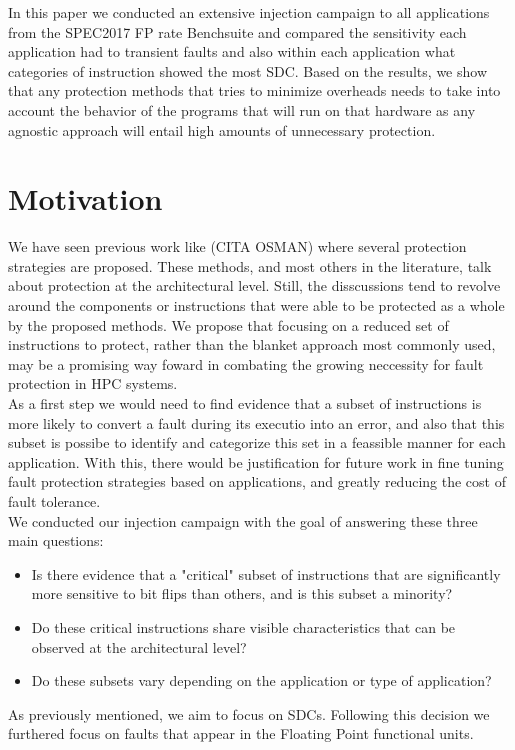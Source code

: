 \documentclass[lettersize,journal]{IEEEtran}
\begin{document}
In this paper we conducted an extensive injection campaign to all applications from the SPEC2017 FP rate Benchsuite and compared the sensitivity each application had to transient faults and also within each application what categories of instruction showed the most SDC. Based on the results, we show that any protection methods that tries to minimize overheads needs to take into account the behavior of the programs that will run on that hardware as any agnostic approach will entail high amounts of unnecessary protection.


\section{Motivation}
We have seen previous work like (CITA OSMAN) where several protection strategies are proposed. These methods, and most others in the literature, talk about protection at the architectural level. Still, the disscussions tend to revolve around the components or instructions that were able to be protected as a whole by the proposed methods. We propose that focusing on a reduced set of instructions to protect, rather than the blanket approach most commonly used, may be a promising way foward in combating the growing neccessity for fault protection in HPC systems.\\
As a first step we would need to find evidence that a subset of instructions is more likely to convert a fault during its executio into an error, and also that this subset is possibe to identify and categorize this set in a feassible manner for each application. With this, there would be justification for future work in fine tuning fault protection strategies based on applications, and greatly reducing the cost of fault tolerance.\\
We conducted our injection campaign with the goal of answering these three main questions:
\begin{itemize}
    \item Is there evidence that a "critical" subset of instructions that are significantly more sensitive to bit flips than others, and is this subset a minority?
    \item Do these critical instructions share visible characteristics that can be observed at the architectural level?
    \item Do these subsets vary depending on the application or type of application?
\end{itemize}
As previously mentioned, we aim to focus on SDCs. Following this decision we furthered focus on faults that appear in the Floating Point functional units. 
\end{document}
